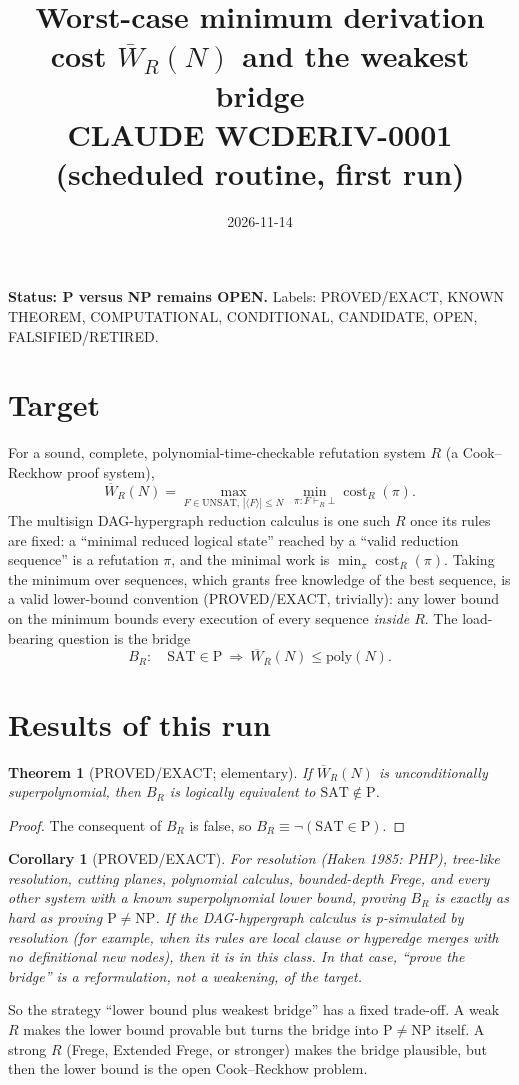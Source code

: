 \documentclass[11pt]{article}
\title{Worst-case minimum derivation cost $\overline W_R(N)$ and the weakest bridge\\ \large CLAUDE WCDERIV-0001 (scheduled routine, first run)}
\date{2026-11-14}
\newtheorem{theorem}{Theorem}\newtheorem{corollary}{Corollary}\newtheorem{definition}{Definition}
\begin{document}
\maketitle
\noindent\textbf{Status: P versus NP remains OPEN.} Labels: PROVED/EXACT, KNOWN THEOREM, COMPUTATIONAL, CONDITIONAL, CANDIDATE, OPEN, FALSIFIED/RETIRED.

\section{Target}
For a sound, complete, polynomial-time-checkable refutation system $R$ (a Cook--Reckhow proof system),
\[\overline W_R(N)=\max_{F\in\mathrm{UNSAT},\,|\langle F\rangle|\le N}\ \min_{\pi:F\vdash_R\bot}\operatorname{cost}_R(\pi).\]
The multisign DAG-hypergraph reduction calculus is one such $R$ once its rules are fixed: a ``minimal reduced logical state'' reached by a ``valid reduction sequence'' is a refutation $\pi$, and the minimal work is $\min_\pi \operatorname{cost}_R(\pi)$. Taking the minimum over sequences, which grants free knowledge of the best sequence, is a valid lower-bound convention (PROVED/EXACT, trivially): any lower bound on the minimum bounds every execution of every sequence \emph{inside $R$}. The load-bearing question is the bridge
\[ B_R:\quad \mathrm{SAT}\in\mathrm P\ \Longrightarrow\ \overline W_R(N)\le \mathrm{poly}(N).\]

\section{Results of this run}
\begin{theorem}[PROVED/EXACT; elementary]\label{t:collapse}
If $\overline W_R(N)$ is unconditionally superpolynomial, then $B_R$ is logically equivalent to $\mathrm{SAT}\notin\mathrm P$.
\end{theorem}
\begin{proof}The consequent of $B_R$ is false, so $B_R\equiv\neg(\mathrm{SAT}\in\mathrm P)$.\end{proof}
\begin{corollary}[PROVED/EXACT]
For resolution (Haken 1985: PHP), tree-like resolution, cutting planes, polynomial calculus, bounded-depth Frege, and every other system with a known superpolynomial lower bound, proving $B_R$ is \emph{exactly as hard as} proving $\mathrm P\ne\mathrm{NP}$. If the DAG-hypergraph calculus is p-simulated by resolution (for example, when its rules are local clause or hyperedge merges with no definitional new nodes), then it is in this class. In that case, ``prove the bridge'' is a reformulation, not a weakening, of the target.
\end{corollary}
\noindent So the strategy ``lower bound plus weakest bridge'' has a fixed trade-off. A weak $R$ makes the lower bound provable but turns the bridge into $\mathrm P\neq\mathrm{NP}$ itself. A strong $R$ (Frege, Extended Frege, or stronger) makes the bridge plausible, but then the lower bound is the open Cook--Reckhow problem.
\end{document}
